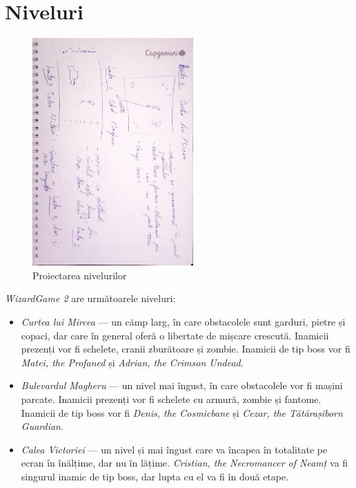 \documentclass{article}
\begin{document}
    \section{Niveluri}

    \begin{figure}[h]
        \includegraphics[width=0.55\textwidth, angle=90]{designing-levels}
        \centering
        \caption{Proiectarea nivelurilor}
    \end{figure}

    \emph{WizardGame 2} are următoarele niveluri:
    \begin{itemize}
        \item \emph{Curtea lui Mircea} --- un cămp larg, în care obstacolele sunt garduri,
        pietre și copaci, dar care în general oferă o libertate de mișcare crescută. Inamicii
        prezenți vor fi schelete, cranii zburătoare și zombie. Inamicii de tip boss vor fi
        \emph{Matei, the Profaned} și \emph{Adrian, the Crimson Undead}.
        \item \emph{Bulevardul Magheru} --- un nivel mai îngust, în care obstacolele vor fi
        mașini parcate. Inamicii prezenți vor fi schelete cu armură, zombie și fantome. Inamicii
        de tip boss vor fi \emph{Denis, the Cosmicbane} și \emph{Cezar, the Tătărașiborn Guardian}.
        \item \emph{Calea Victoriei} --- un nivel și mai îngust care va încapea în totalitate pe
        ecran în înălțime, dar nu în lățime. \emph{Cristian, the Necromancer of Neamț} va fi
        singurul inamic de tip boss, dar lupta cu el va fi în două etape.
    \end{itemize}
\end{document}

